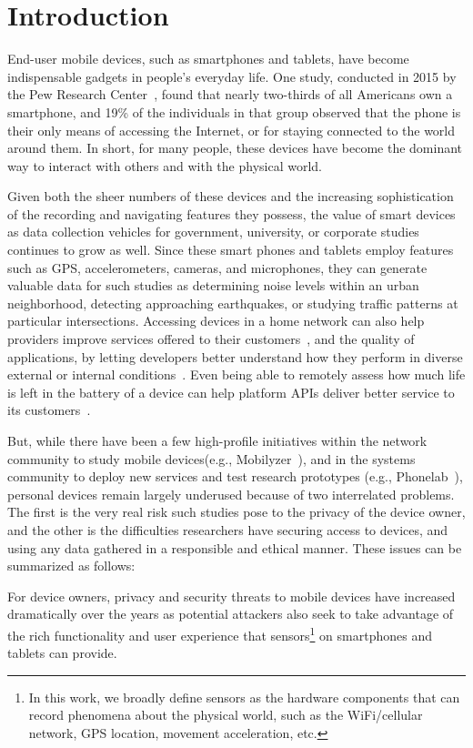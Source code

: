 \section{Introduction}

End-user mobile devices, such as smartphones and tablets, have become
indispensable gadgets in people's everyday life. One study, conducted
in 2015 by the Pew Research Center~\cite{phone2015}, found that nearly two-thirds of
all Americans own a smartphone, and 19\% of the individuals in that
group observed that the phone is their only means of accessing the
Internet, or for staying connected to the world around them. In short,
for many people, these devices have become the dominant way to
interact with others and with the physical world.

Given both the sheer numbers of these devices and the increasing
sophistication of the recording and navigating features they possess,
the value of smart devices as data collection vehicles for government,
university, or corporate studies continues to grow as well. Since
these smart phones and tablets employ features such as GPS,
accelerometers, cameras, and microphones, they can generate valuable
data for such studies as determining noise levels within an urban
neighborhood, detecting approaching earthquakes, or studying traffic
patterns at particular intersections. Accessing devices in a home
network can also help providers improve services offered to their
customers~\cite{sundaresan2011broadband}, and the quality of
applications, by letting developers better understand how they perform
in diverse external or internal
conditions~\cite{ravindranath2012appinsight}. Even being able to
remotely assess how much life is left in the battery of a device can
help platform APIs deliver better service to its
customers~\cite{battery}.

But, while there have been a few high-profile initiatives within the network
community to study mobile devices(e.g.,
Mobilyzer~\cite{nikravesh2015mobilyzer}), and in the systems community
to deploy new services and test research prototypes (e.g.,
Phonelab~\cite{phonelab, nandugudi2013phonelab}), personal devices
remain largely underused because of two interrelated problems. The
first is the very real risk such studies pose to the privacy of the
device owner, and the other is the difficulties researchers have
securing access to devices, and using any data gathered in a
responsible and ethical manner. These issues can be summarized as follows:
					
For device owners, privacy and security threats to mobile devices have
increased dramatically over the years as potential attackers also seek
to take advantage of the rich functionality and user experience that
sensors\footnote{\scriptsize In this work, we broadly define sensors
as the hardware components that can record phenomena about the
physical world, such as the WiFi/cellular network, GPS location,
movement acceleration, etc.} on smartphones and tablets can provide.

